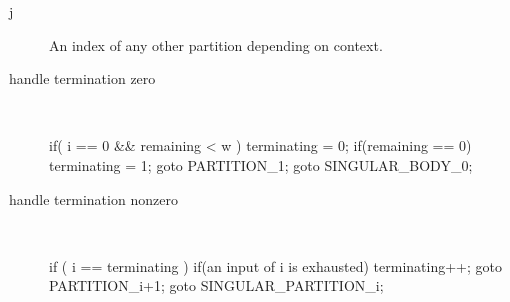 \begin{description}
  \item[j] An index of any other partition depending on context. 
  \item[handle termination zero] \ \ \ 
\begin{samepage}
\begin{code}
if( i == 0 && remaining < w )                            
{                                                          
  terminating = 0;                                     
  if(remaining == 0)                                   
  {                                                    
    terminating = 1;                                   
    goto PARTITION_1;                            
  }                                                    
  goto SINGULAR_BODY_0;
}                                                      
\end{code}
\end{samepage}
\item[handle termination nonzero] \ \ \ 
\begin{samepage}
\begin{code}
if ( i == terminating )                                   
{                                                          
  if(an input of i is exhausted)                  
  {                                                        
    terminating++;                                         
    goto PARTITION_i+1;                                
  }                                                        
  goto SINGULAR_PARTITION_i;
}   
\end{code}
\end{samepage}
\end{description}

